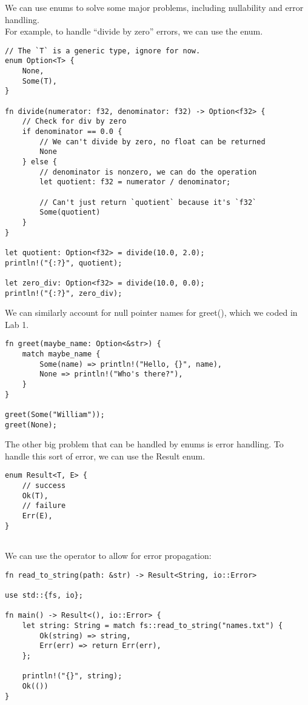 We can use enums to solve some major problems, including nullability and error handling. \\

For example, to handle ``divide by zero'' errors, we can use the  enum.
\begin{lstlisting}[frame = none]
// The `T` is a generic type, ignore for now.
enum Option<T> {
    None,
    Some(T),
}

fn divide(numerator: f32, denominator: f32) -> Option<f32> {
    // Check for div by zero
    if denominator == 0.0 {
        // We can't divide by zero, no float can be returned
        None
    } else {
        // denominator is nonzero, we can do the operation
        let quotient: f32 = numerator / denominator;

        // Can't just return `quotient` because it's `f32`
        Some(quotient)
    }
}

let quotient: Option<f32> = divide(10.0, 2.0);
println!("{:?}", quotient);

let zero_div: Option<f32> = divide(10.0, 0.0);
println!("{:?}", zero_div);

\end{lstlisting}

We can similarly account for null pointer names for greet(), which we coded in Lab 1. 

\begin{lstlisting}[frame = none]
fn greet(maybe_name: Option<&str>) {
    match maybe_name {
        Some(name) => println!("Hello, {}", name),
        None => println!("Who's there?"),
    }
}

greet(Some("William"));
greet(None);
\end{lstlisting}

The other big problem that can be handled by enums is error handling. 
To handle this sort of error, we can use the Result enum.
\begin{lstlisting}[frame = none]
enum Result<T, E> {
    // success
    Ok(T),
    // failure
    Err(E),
}
    
\end{lstlisting}

We can use the  operator to allow for error propagation:

\begin{lstlisting}[frame = none]
fn read_to_string(path: &str) -> Result<String, io::Error>
    
use std::{fs, io};

fn main() -> Result<(), io::Error> {
    let string: String = match fs::read_to_string("names.txt") {
        Ok(string) => string,
        Err(err) => return Err(err),
    };

    println!("{}", string);
    Ok(())
}
\end{lstlisting}

